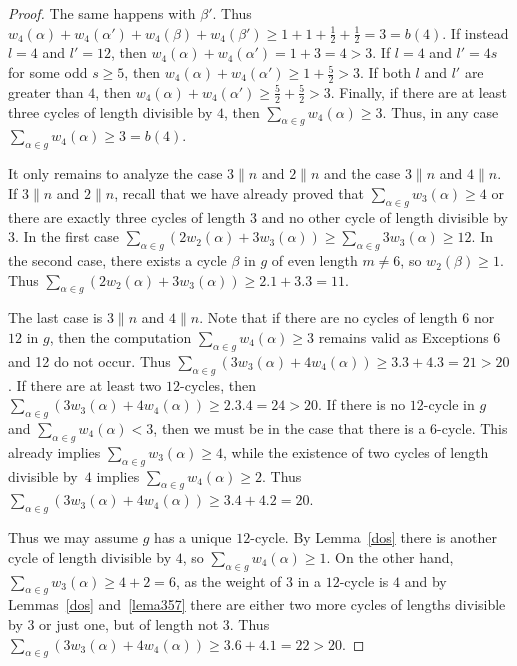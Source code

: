 \documentclass[ALCO,published]{cedram}
\renewcommand{\sigma}{g}
\begin{document}
\begin{proof}
The same happens with $\beta'$. Thus $w_4(\alpha)+w_4(\alpha')+w_4(\beta)+w_4(\beta')\ge 1+1+\frac{1}{2}+\frac{1}{2}=3=b(4)$. If instead $l=4$ and $l'=12$, then $w_4(\alpha)+w_4(\alpha')=1+3=4> 3$. If $l=4$ and $l'=4s$ for some odd $s\ge 5$, then $w_4(\alpha)+w_4(\alpha')\ge 1+\frac{5}{2}>3$. If both $l$ and $l'$ are greater than $4$, then $w_4(\alpha)+w_4(\alpha')\ge \frac{5}{2}+\frac{5}{2}>3$. Finally, if there are at least three cycles of length divisible by $4$, then $\sum\limits_{\alpha \in \sigma} w_4(\alpha)\ge 3$. Thus, in any case $\sum\limits_{\alpha \in \sigma} w_4(\alpha)\ge 3=b(4)$.

It only remains to analyze the case $3\parallel n$ and $2\parallel n$ and the case $3\parallel n$ and $4\parallel n$.        
If $3\parallel n$ and $2\parallel n$, recall that we have already proved that $\sum\limits_{\alpha \in \sigma} w_{3}(\alpha)\ge 4$ or there are exactly three cycles of length $3$ and no other cycle of length divisible by $3$. In the first case $\sum\limits_{\alpha \in \sigma} (2w_{2}(\alpha)+3w_{3}(\alpha))\ge \sum\limits_{\alpha \in \sigma} 3w_{3}(\alpha)\ge 12$. In the second case, there exists a cycle $\beta$ in $\sigma$ of even length $m\neq 6$, so $w_2(\beta)\ge 1$. Thus $\sum\limits_{\alpha \in \sigma} (2w_{2}(\alpha)+3w_{3}(\alpha))\ge 2.1+3.3= 11$. 

The last case is $3\parallel n$ and $4\parallel n$.
Note that if there are no cycles of length $6$ nor~$12$ in $\sigma$, then the computation $\sum\limits_{\alpha \in \sigma} w_4(\alpha)\ge 3$ remains valid as Exceptions 6 and 12 do not occur. Thus $\sum\limits_{\alpha \in \sigma} (3w_{3}(\alpha)+4w_{4}(\alpha))\ge 3.3+4.3=21>20$. If there are at least two $12$-cycles, then $\sum\limits_{\alpha \in \sigma} (3w_{3}(\alpha)+4w_{4}(\alpha))\ge 2.3.4=24>20$. If there is no $12$-cycle in $\sigma$ and $\sum\limits_{\alpha \in \sigma} w_4(\alpha)< 3$, then we must be in the case that there is a $6$-cycle. This already implies $\sum\limits_{\alpha \in \sigma} w_3(\alpha)\ge 4$, while the existence of two cycles of length divisible by~$4$ implies $\sum\limits_{\alpha \in \sigma} w_4(\alpha)\ge 2$. Thus $\sum\limits_{\alpha \in \sigma} (3w_{3}(\alpha)+4w_{4}(\alpha))\ge 3.4+4.2=20$.

Thus we may assume $\sigma$ has a unique $12$-cycle. By Lemma~\ref{dos} there is another cycle of length divisible by $4$, so $\sum\limits_{\alpha \in \sigma} w_4(\alpha)\ge 1$. On the other hand, $\sum\limits_{\alpha \in \sigma} w_{3}(\alpha)\ge 4+2=6$, as the weight of $3$ in a $12$-cycle is $4$ and by Lemmas~\ref{dos} and~\ref{lema357} there are either two more cycles of lengths divisible by $3$ or just one, but of length not $3$. Thus $\sum\limits_{\alpha \in \sigma} (3w_{3}(\alpha)+4w_{4}(\alpha))\ge 3.6+4.1=22>20$.
\end{proof}
\end{document}
